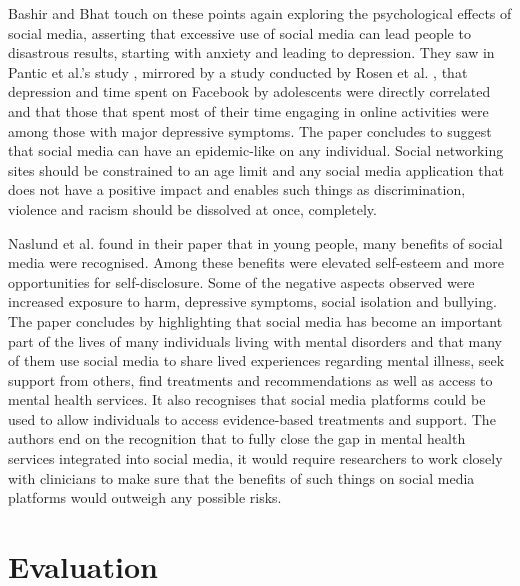 \documentclass[lettersize,journal]{IEEEtran}
\begin{document}
    Bashir and Bhat \cite{Bashir et al 2017} touch on these points again exploring the psychological effects
    of social media, asserting that excessive use of social media can lead people to disastrous results, starting
    with anxiety and leading to depression. They saw in Pantic et al.'s study \cite{Pantic et al 2012}, mirrored
    by a study conducted by Rosen et al. \cite{Rosen et al 2013}, that depression and time spent on Facebook by
    adolescents were directly correlated and that those that spent most of their time engaging in online activities
    were among those with major depressive symptoms. The paper concludes to suggest that social media can have an
    epidemic-like on any individual. Social networking sites should be constrained to an age limit and any
    social media application that does not have a positive impact and enables such things as discrimination, violence
    and racism should be dissolved at once, completely.

    Naslund et al. \cite{Naslund et al 2020} found in their paper that in young people, many benefits of social
    media were recognised. Among these benefits were elevated self-esteem and more opportunities for
    self-disclosure. Some of the negative aspects observed were increased exposure to harm, depressive symptoms,
    social isolation and bullying. The paper concludes by highlighting that social media has become an important part
    of the lives of many individuals living with mental disorders and that many of them use social media to share
    lived experiences regarding mental illness, seek support from others, find treatments and recommendations as
    well as access to mental health services. It also recognises that social media platforms could be used to
    allow individuals to access evidence-based treatments and support. The authors end on the recognition that to
    fully close the gap in mental health services integrated into social media, it would require researchers
    to work closely with clinicians to make sure that the benefits of such things on social media platforms would
    outweigh any possible risks.
\section{Evaluation}
\end{document}
